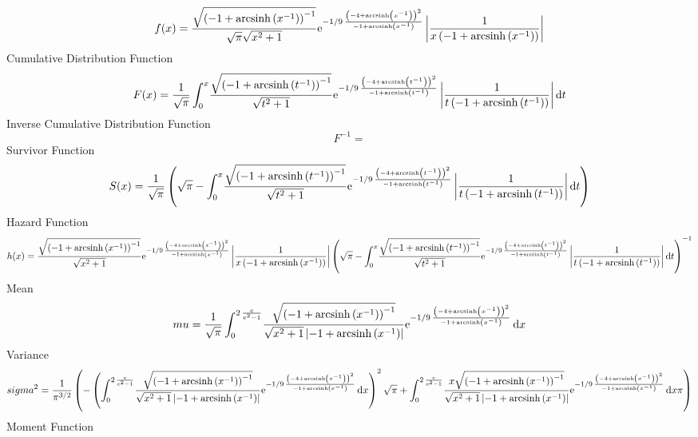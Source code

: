 \documentclass[12pt]{article}
\begin{document}
$$  f(x)={\frac {\sqrt { \left( -1+{\rm arcsinh} \left({x}^{-1}\right) \right) 
^{-1}}}{\sqrt {\pi}\sqrt {{x}^{2}+1}}{{\rm e}^{-1/9\,{\frac { \left( -
4+{\rm arcsinh} \left({x}^{-1}\right) \right) ^{2}}{-1+{\rm arcsinh} 
\left({x}^{-1}\right)}}}} \left| {\frac {1}{x \left( -1+{\rm arcsinh} 
\left({x}^{-1}\right) \right) }} \right| }
$$Cumulative Distribution Function  
 $$F(x)={\frac {1}{\sqrt {\pi}}\int_{0}^{x}\!{\frac {\sqrt { \left( -1+
{\rm arcsinh} \left({t}^{-1}\right) \right) ^{-1}}}{\sqrt {{t}^{2}+1}}
{{\rm e}^{-1/9\,{\frac { \left( -4+{\rm arcsinh} \left({t}^{-1}\right)
 \right) ^{2}}{-1+{\rm arcsinh} \left({t}^{-1}\right)}}}} \left| {
\frac {1}{t \left( -1+{\rm arcsinh} \left({t}^{-1}\right) \right) }}
 \right| }\,{\rm d}t}
$$ Inverse Cumulative Distribution Function 
  $$F^{-1} = $$Survivor Function 
 $$ S(x)={\frac {1}{\sqrt {\pi}} \left( \sqrt {\pi}-\int_{0}^{x}\!{\frac {
\sqrt { \left( -1+{\rm arcsinh} \left({t}^{-1}\right) \right) ^{-1}}}{
\sqrt {{t}^{2}+1}}{{\rm e}^{-1/9\,{\frac { \left( -4+{\rm arcsinh} 
\left({t}^{-1}\right) \right) ^{2}}{-1+{\rm arcsinh} \left({t}^{-1}
\right)}}}} \left| {\frac {1}{t \left( -1+{\rm arcsinh} \left({t}^{-1}
\right) \right) }} \right| }\,{\rm d}t \right) }
$$ Hazard Function 
 $$ h(x)={\frac {\sqrt { \left( -1+{\rm arcsinh} \left({x}^{-1}\right) \right) 
^{-1}}}{\sqrt {{x}^{2}+1}}{{\rm e}^{-1/9\,{\frac { \left( -4+
{\rm arcsinh} \left({x}^{-1}\right) \right) ^{2}}{-1+{\rm arcsinh} 
\left({x}^{-1}\right)}}}} \left| {\frac {1}{x \left( -1+{\rm arcsinh} 
\left({x}^{-1}\right) \right) }} \right|  \left( \sqrt {\pi}-\int_{0}^
{x}\!{\frac {\sqrt { \left( -1+{\rm arcsinh} \left({t}^{-1}\right)
 \right) ^{-1}}}{\sqrt {{t}^{2}+1}}{{\rm e}^{-1/9\,{\frac { \left( -4+
{\rm arcsinh} \left({t}^{-1}\right) \right) ^{2}}{-1+{\rm arcsinh} 
\left({t}^{-1}\right)}}}} \left| {\frac {1}{t \left( -1+{\rm arcsinh} 
\left({t}^{-1}\right) \right) }} \right| }\,{\rm d}t \right) ^{-1}}
$$Mean 
 $$ mu={\frac {1}{\sqrt {\pi}}\int_{0}^{2\,{\frac {{\rm e}}{{{\rm e}^{2}}-1}}
}\!{\frac {\sqrt { \left( -1+{\rm arcsinh} \left({x}^{-1}\right)
 \right) ^{-1}}}{\sqrt {{x}^{2}+1} \left| -1+{\rm arcsinh} \left({x}^{
-1}\right) \right| }{{\rm e}^{-1/9\,{\frac { \left( -4+{\rm arcsinh} 
\left({x}^{-1}\right) \right) ^{2}}{-1+{\rm arcsinh} \left({x}^{-1}
\right)}}}}}\,{\rm d}x}
$$ Variance 
 $$ sigma^2 = {\frac {1}{{\pi}^{3/2}} \left( - \left( \int_{0}^{2\,{\frac {{\rm e}}{
{{\rm e}^{2}}-1}}}\!{\frac {\sqrt { \left( -1+{\rm arcsinh} \left({x}^
{-1}\right) \right) ^{-1}}}{\sqrt {{x}^{2}+1} \left| -1+{\rm arcsinh} 
\left({x}^{-1}\right) \right| }{{\rm e}^{-1/9\,{\frac { \left( -4+
{\rm arcsinh} \left({x}^{-1}\right) \right) ^{2}}{-1+{\rm arcsinh} 
\left({x}^{-1}\right)}}}}}\,{\rm d}x \right) ^{2}\sqrt {\pi}+\int_{0}^
{2\,{\frac {{\rm e}}{{{\rm e}^{2}}-1}}}\!{\frac {x\sqrt { \left( -1+
{\rm arcsinh} \left({x}^{-1}\right) \right) ^{-1}}}{\sqrt {{x}^{2}+1}
 \left| -1+{\rm arcsinh} \left({x}^{-1}\right) \right| }{{\rm e}^{-1/9
\,{\frac { \left( -4+{\rm arcsinh} \left({x}^{-1}\right) \right) ^{2}
}{-1+{\rm arcsinh} \left({x}^{-1}\right)}}}}}\,{\rm d}x\pi \right) }
$$Moment Function 
\end{document}
